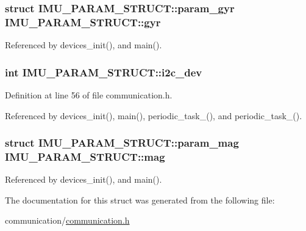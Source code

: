 \hypertarget{structIMU__PARAM__STRUCT_a5a4557868f1af679a1098808397b02ec}{
\subsubsection[{gyr}]{\setlength{\rightskip}{0pt plus 5cm}struct {\bf I\-M\-U\-\_\-\-P\-A\-R\-A\-M\-\_\-\-S\-T\-R\-U\-C\-T\-::param\-\_\-gyr} I\-M\-U\-\_\-\-P\-A\-R\-A\-M\-\_\-\-S\-T\-R\-U\-C\-T\-::gyr}}\label{structIMU__PARAM__STRUCT_a5a4557868f1af679a1098808397b02ec}


Referenced by devices\-\_\-init(), and main().

\hypertarget{structIMU__PARAM__STRUCT_a8a870f383fc9ba0b682fdc9b8c0d2734}{
\subsubsection[{i2c\-\_\-dev}]{\setlength{\rightskip}{0pt plus 5cm}int I\-M\-U\-\_\-\-P\-A\-R\-A\-M\-\_\-\-S\-T\-R\-U\-C\-T\-::i2c\-\_\-dev}}\label{structIMU__PARAM__STRUCT_a8a870f383fc9ba0b682fdc9b8c0d2734}


Definition at line 56 of file communication.\-h.



Referenced by devices\-\_\-init(), main(), periodic\-\_\-task\-\_(), and periodic\-\_\-task\-\_().

\hypertarget{structIMU__PARAM__STRUCT_a26b277dcaf05f3842995df888225f6f4}{
\subsubsection[{mag}]{\setlength{\rightskip}{0pt plus 5cm}struct {\bf I\-M\-U\-\_\-\-P\-A\-R\-A\-M\-\_\-\-S\-T\-R\-U\-C\-T\-::param\-\_\-mag} I\-M\-U\-\_\-\-P\-A\-R\-A\-M\-\_\-\-S\-T\-R\-U\-C\-T\-::mag}}\label{structIMU__PARAM__STRUCT_a26b277dcaf05f3842995df888225f6f4}


Referenced by devices\-\_\-init(), and main().



The documentation for this struct was generated from the following file\-:\begin{DoxyCompactItemize}
\item 
communication/\hyperlink{communication_2communication_8h}{communication.\-h}\end{DoxyCompactItemize}
